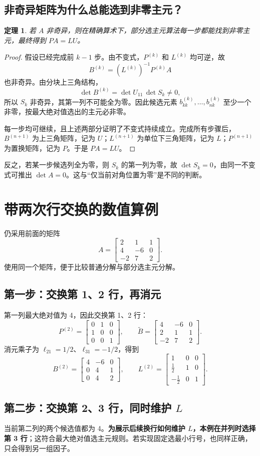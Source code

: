 \documentclass[UTF8,11pt,a4paper,fontset=fandol]{ctexart}
\newcommand{\mat}[1]{\begin{bmatrix}#1\end{bmatrix}}
\newtheorem{theorem}{定理}[section]
\begin{document}
\subsection{非奇异矩阵为什么总能选到非零主元？}
\begin{theorem}
若 $A$ 非奇异，则在精确算术下，部分选主元算法每一步都能找到非零主元，最终得到 $PA=LU$。
\end{theorem}
\begin{proof}
假设已经完成前 $k-1$ 步。由不变式，$P^{(k)}$ 和 $L^{(k)}$ 均可逆，故
\[
B^{(k)}=(L^{(k)})^{-1}P^{(k)}A
\]
也非奇异。由分块上三角结构，
\[
\det B^{(k)}=\det U_{11}\,\det S_k\ne0,
\]
所以 $S_k$ 非奇异，其第一列不可能全为零。因此候选元素 $b^{(k)}_{kk},\ldots,b^{(k)}_{nk}$ 至少一个非零，按最大绝对值选出的主元必非零。

每一步均可继续，且上述两部分证明了不变式持续成立。完成所有步骤后，$B^{(n+1)}$ 为上三角矩阵，记为 $U$；$L^{(n+1)}$ 为单位下三角矩阵，记为 $L$；$P^{(n+1)}$ 为置换矩阵，记为 $P$。于是 $PA=LU$。
\end{proof}
反之，若某一步候选列全为零，则 $S_k$ 的第一列为零，故 $\det S_k=0$，由同一不变式可推出 $\det A=0$。这与“仅当前对角位置为零”是不同的判断。

\section{带两次行交换的数值算例}
仍采用前面的矩阵
\[
A=\mat{2&1&1\\4&-6&0\\-2&7&2}.
\]
使用同一个矩阵，便于比较普通分解与部分选主元分解。

\subsection{第一步：交换第 1、2 行，再消元}
第一列最大绝对值为 4，因此交换第 1、2 行：
\[
P^{(2)}=\mat{0&1&0\\1&0&0\\0&0&1},\qquad
\widetilde B=\mat{4&-6&0\\2&1&1\\-2&7&2}.
\]
消元乘子为 $\ell_{21}=1/2$、$\ell_{31}=-1/2$，得到
\[
B^{(2)}=\mat{4&-6&0\\0&4&1\\0&4&2},\qquad
L^{(2)}=\mat{1&0&0\\\frac12&1&0\\-\frac12&0&1}.
\]

\subsection{第二步：交换第 2、3 行，同时维护 $L$}
当前第二列的两个候选值都为 4。\textbf{为展示后续换行如何维护 $L$，本例在并列时选择第 3 行}；这符合最大绝对值选主元规则。若实现固定选最小行号，也同样正确，只会得到另一组因子。
\end{document}

